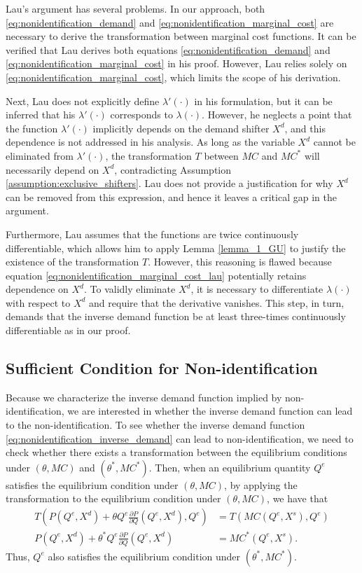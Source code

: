 \documentclass[11pt, a4paper]{article}
\theoremstyle{remark}
\begin{document}
Lau's argument has several problems.
In our approach, both \eqref{eq:nonidentification_demand} and \eqref{eq:nonidentification_marginal_cost} are necessary to derive the transformation between marginal cost functions. 
It can be verified that Lau derives both equations \eqref{eq:nonidentification_demand} and \eqref{eq:nonidentification_marginal_cost} in his proof.
However, Lau relies solely on \eqref{eq:nonidentification_marginal_cost}, which limits the scope of his derivation.

Next, Lau does not explicitly define $\lambda'(\cdot)$ in his formulation, but it can be inferred that his $\lambda'(\cdot)$ corresponds to $\lambda(\cdot)$.
However, he neglects a point that the function $\lambda'(\cdot)$ implicitly depends on the demand shifter $X^{d}$, and this dependence is not addressed in his analysis.
As long as the variable $X^d$ cannot be eliminated from $\lambda'(\cdot)$, the transformation $T$ between $MC$ and $MC^*$ will necessarily depend on $X^d$, contradicting Assumption \ref{assumption:exclusive_shifters}.
Lau does not provide a justification for why $X^d$ can be removed from this expression, and hence it leaves a critical gap in the argument.

Furthermore, Lau assumes that the functions are twice continuously differentiable, which allows him to apply Lemma \ref{lemma_1_GU} to justify the existence of the transformation $T$. 
However, this reasoning is flawed because equation \eqref{eq:nonidentification_marginal_cost_lau} potentially retains dependence on $X^d$. 
To validly eliminate $X^d$, it is necessary to differentiate $\lambda(\cdot)$ with respect to $X^d$ and require that the derivative vanishes. 
This step, in turn, demands that the inverse demand function be at least three-times continuously differentiable as in our proof.




\subsection{Sufficient Condition for Non-identification}\label{subsec:sufficient_condition_nonidentification}
Because we characterize the inverse demand function implied by non-identification, we are interested in whether the inverse demand function can lead to the non-identification.
To see whether the inverse demand function \eqref{eq:nonidentification_inverse_demand} can lead to non-identification, we need to check whether there exists a transformation between the equilibrium conditions under $(\theta, MC)$ and $(\theta^{*}, MC^{*})$.
Then, when an equilibrium quantity $Q^e$ satisfies the equilibrium condition under $(\theta, MC)$, by applying the transformation to the equilibrium condition under $(\theta, MC)$, we have that
\begin{align}
    T\left(P(Q^e, X^{d}) + \theta Q^e \frac{\partial P}{\partial Q}(Q^e, X^{d}), Q^e\right)&= T\left(MC(Q^e, X^{s}), Q^e\right)\\
    P(Q^e, X^{d}) + \theta^{*} Q^e \frac{\partial P}{\partial Q}(Q^e, X^{d})&= MC^{*}(Q^e, X^{s}).
\end{align}
Thus, $Q^e$ also satisfies the equilibrium condition under $(\theta^{*}, MC^{*})$.
\end{document}
